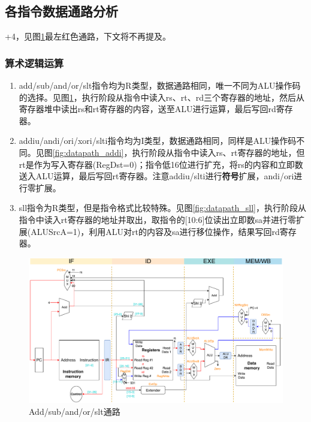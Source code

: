 
\subsection{各指令数据通路分析}
+4，见图\ref{fig:datapath_add}最左红色通路，下文将不再提及。
\subsubsection{算术逻辑运算}
\begin{enumerate}
	\item add/sub/and/or/slt指令均为R类型，数据通路相同，唯一不同为ALU操作码的选择。见图\ref{fig:datapath_add}，执行阶段从指令中读入rs、rt、rd三个寄存器的地址，然后从寄存器堆中读出rs和rt寄存器的内容，送至ALU进行运算，最后写回rd寄存器。
	\item addiu/andi/ori/xori/slti指令均为I类型，数据通路相同，同样是ALU操作码不同。见图\ref{fig:datapath_addi}，执行阶段从指令中读入rs、rt寄存器的地址，但rt是作为写入寄存器(RegDst=0)；指令低16位进行扩充，将rs的内容和立即数送入ALU运算，最后写回rt寄存器。注意addiu/slti进行\textbf{符号}扩展，andi/ori进行零扩展。
	\item sll指令为R类型，但是指令格式比较特殊。见图\ref{fig:datapath_sll}，执行阶段从指令中读入rt寄存器的地址并取出，取指令的[10:6]位读出立即数sa并进行零扩展(ALUSrcA=1)，利用ALU对rt的内容及sa进行移位操作，结果写回rd寄存器。
\end{enumerate}
\begin{figure}[H]
\centering
\includegraphics[width=\linewidth]{fig/Datapath-add-sub.pdf}
\caption{Add/sub/and/or/slt通路}
\label{fig:datapath_add}
\end{figure}
